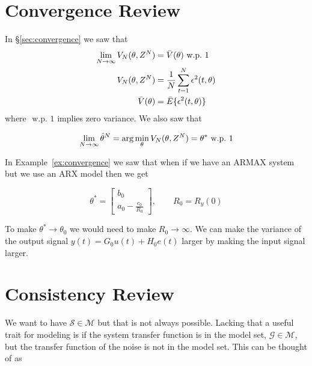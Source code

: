 \mainmatter%
\setcounter{page}{1}

\lectureseries[\course]{\course}

\date{November 12, 2009}

\setaddress%

\setcounter{lecture}{13}
\setcounter{chapter}{13}


\section{Convergence Review}
In \S\ref{sec:convergence} we saw that
\begin{align*}
\lim_{N\to\infty}V_N(\theta,Z^N) &= \bar{V}(\theta) \text{~w.p.~} 1 \\
V_N(\theta,Z^N) &= \frac{1}{N}\sum_{t=1}^N\epsilon^2(t,\theta) \\
\bar{V}(\theta) &= \bar{E}\{\epsilon^2(t,\theta)\}
\end{align*}
where $\text{ w.p. } 1$ implies zero variance.
We also saw that

\begin{equation*}
\lim_{N\to\infty}\hat{\theta}^N = \arg\min_\theta V_N(\theta,Z^N) = \theta^\ast \text{~w.p.~} 1
\end{equation*}

In Example~\ref{ex:convergence} we saw that when if we have an ARMAX system but we use an ARX model then we get

\begin{equation*}
\theta^\ast = \left[\begin{array}{c} b_0 \\ a_0-\frac{c_0}{R_0} \end{array}\right], \qquad R_0=R_y (0)
\end{equation*}

To make $\theta^\ast\to\theta_0$ we would need to make $R_0\to\infty$.
We can make the variance of the output signal $y (t)=G_0u (t)+H_0e (t)$ larger by making the input signal larger.

\section{Consistency Review}
We want to have $\mathcal{S}\in\mathcal{M}$ but that is not always possible.
Lacking that a useful trait for modeling is if the system transfer function is in the model set, $\mathcal{G}\in\mathcal{M}$, but the transfer function of the noise is not in the model set.
This can be thought of as

